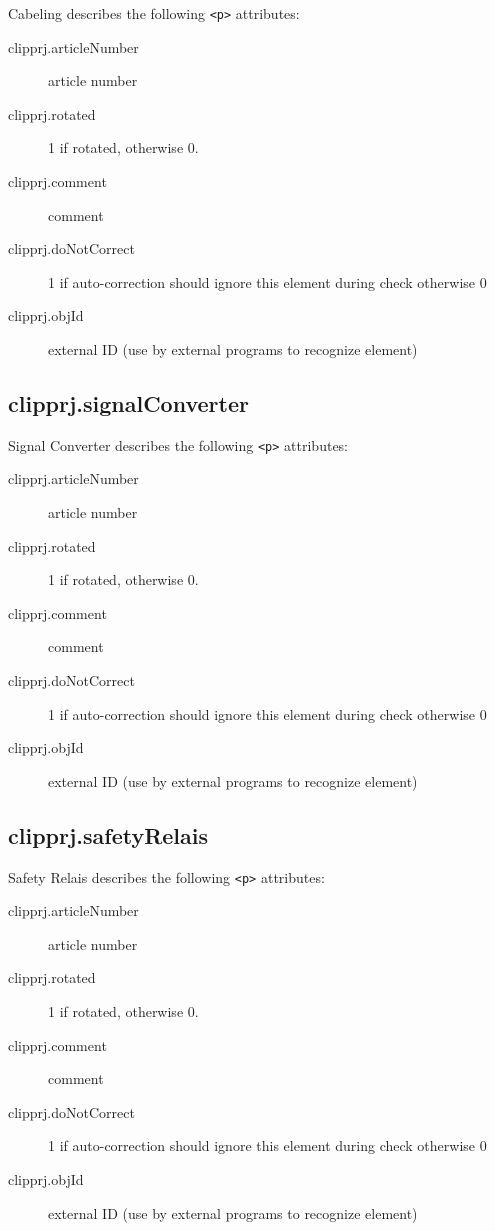 \documentclass[%
	a4paper,
	oneside,
	listof=numbered,
	parskip=half,
	headsepline=true,
	footsepline=false,
	0.7headlines,
	]{scrbook}
\begin{document}
Cabeling describes the following \verb|<p>| attributes: 

\begin{description}
	\item[clipprj.articleNumber] article number 
	\item[clipprj.rotated] 1 if rotated, otherwise 0. 
	\item[clipprj.comment] comment 
	\item[clipprj.doNotCorrect] 1 if auto-correction should ignore this element during check otherwise 0 
	\item[clipprj.objId] external ID (use by external programs to recognize element) 
\end{description}

\subsection{clipprj.signalConverter}
 
Signal Converter describes the following \verb|<p>| attributes: 

\begin{description}
	\item[clipprj.articleNumber] article number 
	\item[clipprj.rotated] 1 if rotated, otherwise 0. 
	\item[clipprj.comment] comment 
	\item[clipprj.doNotCorrect] 1 if auto-correction should ignore this element during check otherwise 0 
	\item[clipprj.objId] external ID (use by external programs to recognize element) 
\end{description}

\subsection{clipprj.safetyRelais}
 
Safety Relais describes the following \verb|<p>| attributes: 

\begin{description}
	\item[clipprj.articleNumber] article number 
	\item[clipprj.rotated] 1 if rotated, otherwise 0. 
	\item[clipprj.comment] comment 
	\item[clipprj.doNotCorrect] 1 if auto-correction should ignore this element during check otherwise 0 
	\item[clipprj.objId] external ID (use by external programs to recognize element) 
\end{description}
\end{document}
